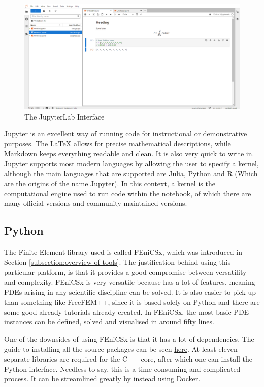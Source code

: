 \begin{figure}[h]
\centering
\includegraphics[scale=0.3]{./images/misc/jupyterLab}
\caption{The JupyterLab Interface} \label{fig:jupyter-lab}
\end{figure}

Jupyter is an excellent way of running code for instructional or demonstrative purposes. The LaTeX allows for precise mathematical descriptions, while Markdown keeps everything readable and clean. It is also very quick to write in. Jupyter supports most modern languages by allowing the user to specify a kernel, although the main languages that are supported are Julia, Python and R (Which are the origins of the name Jupyter). In this context, a kernel is the computational engine used to run code within the notebook, of which there are many official versions and community-maintained versions.

\subsection{Python} \label{subsection:python}

The Finite Element library used is called FEniCSx, which was introduced in Section \ref{subsection:overview-of-tools}. The justification behind using this particular platform, is that it provides a good compromise between versatility and complexity. FEniCSx is very versatile because has a lot of features, meaning PDEs arising in any scientific discipline can be solved. It is also easier to pick up than something like FreeFEM++, since it is based solely on Python and there are some good already tutorials already created. In FEniCSx, the most basic PDE instances can be defined, solved and visualised in around fifty lines.

One of the downsides of using FEniCSx is that it has a lot of dependencies. The guide to installing all the source packages can be seen \href{https://docs.fenicsproject.org/dolfinx/main/python/installation.html#source}{here}. At least eleven separate libraries are required for the C++ core, after which one can install the Python interface. Needless to say, this is a time consuming and complicated process. It can be streamlined greatly by instead using Docker.

